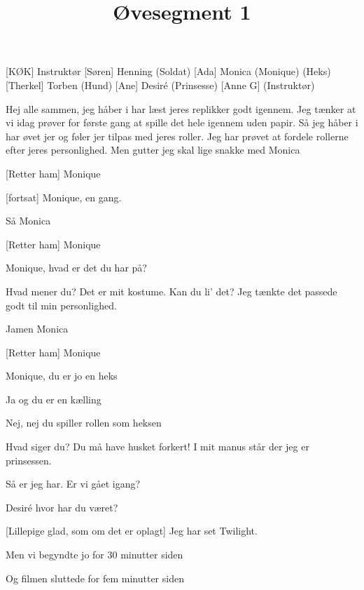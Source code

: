\documentclass[a4paper,11pt]{article}
\title{Øvesegment 1}
\author{}
\begin{document}
\maketitle

\begin{roles}
[KØK] Instruktør
[Søren] Henning (Soldat)
[Ada] Monica (Monique) (Heks)
[Therkel] Torben (Hund)
[Ane] Desiré (Prinsesse)
[Anne G] (Instruktør)
\end{roles}

\begin{sketch}
 Hej alle sammen, jeg håber i har læst jeres replikker godt igennem. Jeg tænker at vi idag prøver for første gang at spille det hele igennem uden papir. Så jeg håber i har øvet jer og føler jer tilpas med jeres roller. Jeg har prøvet at fordele rollerne efter jeres personlighed.  Men gutter jeg skal lige snakke med Monica 

[Retter ham] Monique

[fortsat] Monique, en gang.


 Så Monica

[Retter ham] Monique

 Monique, hvad er det du har på?

 Hvad mener du? Det er mit kostume. Kan du li' det? Jeg tænkte det passede godt til min personlighed. 

 Jamen Monica

[Retter ham] Monique

 Monique, du er jo en heks

 Ja og du er en kælling

 Nej, nej du spiller rollen som heksen

 Hvad siger du? Du må have husket forkert! I mit manus står der jeg er prinsessen.

 Så er jeg har. Er vi gået igang? 

 Desiré hvor har du været?

[Lillepige glad, som om det er oplagt] Jeg har set Twilight.

 Men vi begyndte jo for 30 minutter siden

 Og filmen sluttede for fem minutter siden


\end{sketch}
\end{document}
